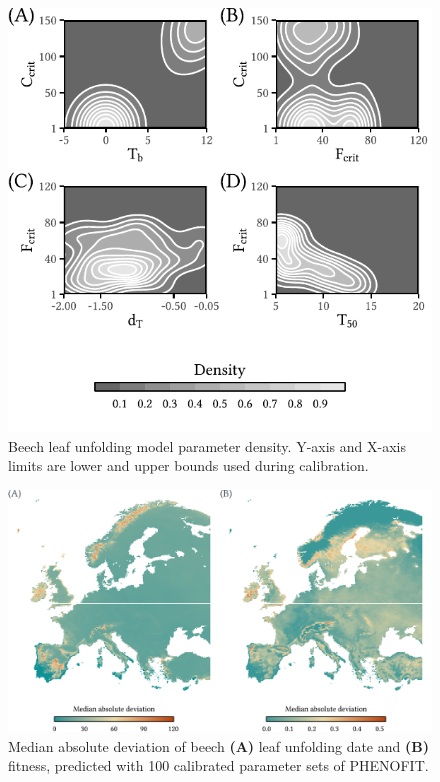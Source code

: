 \begin{figure}[h]
\centering 
\includegraphics{chapter1/figs/supp/leafpardensity} 
\caption{Beech leaf unfolding model parameter density. Y-axis and X-axis limits are lower and upper bounds used during calibration.}\label{fig:leafpardensity}
\end{figure}

\begin{figure}[h]
\centering 
\includegraphics{chapter1/figs/supp/consensusfitnessmap} 
\caption{Median absolute deviation of beech \textbf{(A)} leaf unfolding date and \textbf{(B)} fitness, predicted with 100 calibrated parameter sets of PHENOFIT.}\label{fig:consensusfitnessmap}
\end{figure}

